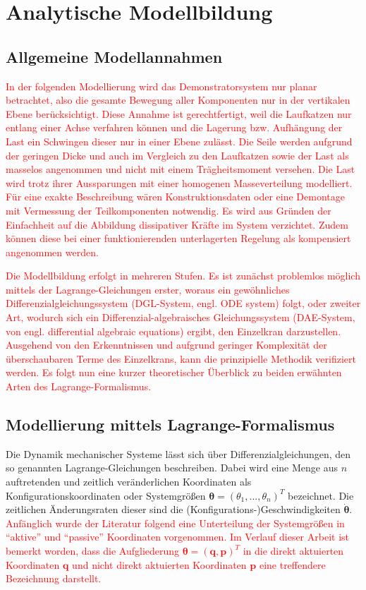 \chapter{Analytische Modellbildung}

\section{Allgemeine Modellannahmen}

\textcolor{red}{In der folgenden Modellierung wird das Demonstratorsystem nur planar betrachtet, also die gesamte Bewegung aller Komponenten nur in der vertikalen Ebene berücksichtigt. Diese Annahme ist gerechtfertigt, weil die Laufkatzen nur entlang einer Achse verfahren können und die Lagerung bzw. Aufhängung der Last ein Schwingen dieser nur in einer Ebene zulässt. Die Seile werden aufgrund der geringen Dicke und auch im Vergleich zu den Laufkatzen sowie der Last als masselos angenommen und nicht mit einem Trägheitsmoment versehen. Die Last wird trotz ihrer Aussparungen mit einer homogenen Masseverteilung modelliert. Für eine exakte Beschreibung wären Konstruktionsdaten oder eine Demontage mit Vermessung der Teilkomponenten notwendig. Es wird aus Gründen der Einfachheit auf die Abbildung dissipativer Kräfte im System verzichtet. Zudem können diese bei einer funktionierenden unterlagerten Regelung als kompensiert angenommen werden.}

\textcolor{red}{Die Modellbildung erfolgt in mehreren Stufen. Es ist zunächst problemlos möglich mittels der Lagrange-Gleichungen erster, woraus ein gewöhnliches Differenzialgleichungssystem (DGL-System, engl. ODE system) folgt, oder zweiter Art, wodurch sich ein Differenzial-algebraisches Gleichungssystem (DAE-System, von engl. differential algebraic equations) ergibt, den Einzelkran darzustellen. Ausgehend von den Erkenntnissen und aufgrund geringer Komplexität der überschaubaren Terme des Einzelkrans, kann die prinzipielle Methodik verifiziert werden. Es folgt nun eine kurzer theoretischer Überblick zu beiden erwähnten Arten des Lagrange-Formalismus.}

\section{Modellierung mittels Lagrange-Formalismus}
Die Dynamik mechanischer Systeme lässt sich über Differenzialgleichungen, den so genannten Lagrange-Gleichungen beschreiben. Dabei wird eine Menge aus $n$ auftretenden und zeitlich veränderlichen Koordinaten als Konfigurationskoordinaten oder Systemgrößen $\boldsymbol{\theta} = (\theta_1, ..., \theta_n)^T$ bezeichnet. Die zeitlichen Änderungsraten dieser sind die (Konfigurations-)Geschwindigkeiten $\dot{\boldsymbol{\theta}}$. \textcolor{red}{Anfänglich wurde der Literatur \cite[S.10]{DissKnoll} folgend eine Unterteilung der Systemgrößen in ``aktive'' und ``passive'' Koordinaten vorgenommen. Im Verlauf dieser Arbeit ist bemerkt worden, dass die 
Aufgliederung $\boldsymbol{\theta} = (\mathbf{q}, \mathbf{p})^T$ in die direkt aktuierten Koordinaten $\mathbf{q}$ und nicht direkt aktuierten Koordinaten $\mathbf{p}$ eine treffendere Bezeichnung darstellt.}
\cite[S.7]{DissKnoll} 

